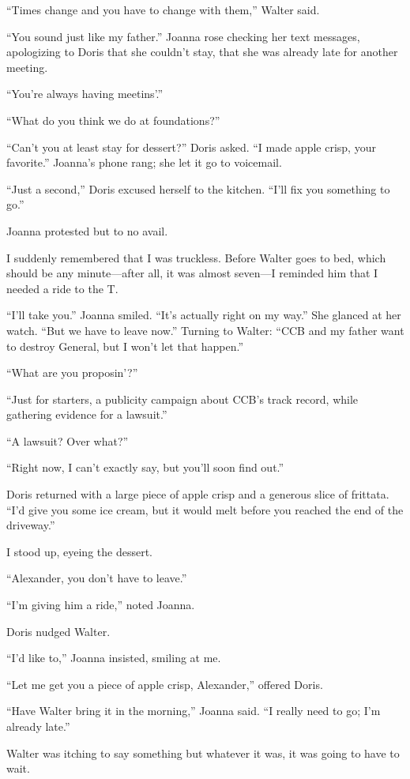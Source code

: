 ``Times change and you have to change with them,'' Walter said.

``You sound just like my father.'' Joanna rose checking her text
messages, apologizing to Doris that she couldn't stay, that she was
already late for another meeting.

``You're always having meetins'.''

``What do you think we do at foundations?''

``Can't you at least stay for dessert?'' Doris asked. ``I made apple
crisp, your favorite.'' Joanna's phone rang; she let it go to voicemail.

``Just a second,'' Doris excused herself to the kitchen. ``I'll fix you
something to go.''

Joanna protested but to no avail.

I suddenly remembered that I was truckless. Before Walter goes to bed,
which should be any minute---after all, it was almost seven---I reminded
him that I needed a ride to the T.

``I'll take you.'' Joanna smiled. ``It's actually right on my way.'' She
glanced at her watch. ``But we have to leave now.'' Turning to Walter:
``CCB and my father want to destroy General, but I won't let that
happen.''

``What are you proposin'?''

``Just for starters, a publicity campaign about CCB's track record,
while gathering evidence for a lawsuit.''

``A lawsuit? Over what?''

``Right now, I can't exactly say, but you'll soon find out.''

Doris returned with a large piece of apple crisp and a generous slice of
frittata. ``I'd give you some ice cream, but it would melt before you
reached the end of the driveway.''

I stood up, eyeing the dessert.

``Alexander, you don't have to leave.''

``I'm giving him a ride,'' noted Joanna.

Doris nudged Walter.

``I'd like to,'' Joanna insisted, smiling at me.

``Let me get you a piece of apple crisp, Alexander,'' offered Doris.

``Have Walter bring it in the morning,'' Joanna said. ``I really need to
go; I'm already late.''

Walter was itching to say something but whatever it was, it was going to
have to wait.

